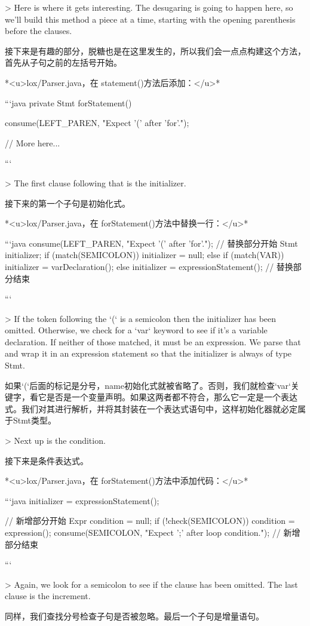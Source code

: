 \documentclass[cn,11pt,chinese]{elegantbook}
\begin{document}
{{{{{> Here is where it gets interesting. The desugaring is going to happen here, so we’ll build this method a piece at a time, starting with the opening parenthesis before the clauses.

接下来是有趣的部分，脱糖也是在这里发生的，所以我们会一点点构建这个方法，首先从子句之前的左括号开始。

*<u>lox/Parser.java，在 statement()方法后添加：</u>*

```java
  private Stmt forStatement() {
    consume(LEFT_PAREN, "Expect '(' after 'for'.");

    // More here...
  }
```

> The first clause following that is the initializer.

接下来的第一个子句是初始化式。

*<u>lox/Parser.java，在 forStatement()方法中替换一行：</u>*

```java
    consume(LEFT_PAREN, "Expect '(' after 'for'.");
    // 替换部分开始
    Stmt initializer;
    if (match(SEMICOLON)) {
      initializer = null;
    } else if (match(VAR)) {
      initializer = varDeclaration();
    } else {
      initializer = expressionStatement();
    }
    // 替换部分结束
  }
```

> If the token following the `(` is a semicolon then the initializer has been omitted. Otherwise, we check for a `var` keyword to see if it’s a variable declaration. If neither of those matched, it must be an expression. We parse that and wrap it in an expression statement so that the initializer is always of type Stmt.

如果`(`后面的标记是分号，name初始化式就被省略了。否则，我们就检查`var`关键字，看它是否是一个变量声明。如果这两者都不符合，那么它一定是一个表达式。我们对其进行解析，并将其封装在一个表达式语句中，这样初始化器就必定属于Stmt类型。

> Next up is the condition.

接下来是条件表达式。

*<u>lox/Parser.java，在 forStatement()方法中添加代码：</u>*

```java
      initializer = expressionStatement();
    }
    // 新增部分开始
    Expr condition = null;
    if (!check(SEMICOLON)) {
      condition = expression();
    }
    consume(SEMICOLON, "Expect ';' after loop condition.");
    // 新增部分结束
  }
```

> Again, we look for a semicolon to see if the clause has been omitted. The last clause is the increment.

同样，我们查找分号检查子句是否被忽略。最后一个子句是增量语句。

}}
\end{document}
